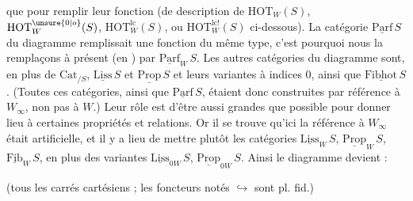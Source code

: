que  pour remplir leur fonction (de description de $\mathrm{HOT}_W(S)$, $\mathrm{HOT}_W^{\unsure{0|o}}(S)$, $\mathrm{HOT}_W^{\mathrm{lc}}(S)$, ou $\mathrm{HOT}_W^{\mathrm{lc}!}(S)$
ci-dessous). La catégorie $\underline{\mathrm{Parf}}\,S$ du diagramme
remplissait une fonction du même type, c'est
pourquoi nous la remplaçons à présent (en ) par $\underline{\mathrm{Parf}}_W\,S$. Les autres catégories du
diagramme sont, en plus de $\mathrm{Cat}_{/S}$, $\underline{\mathrm{Liss}}\,S$ et
$\underline{\mathrm{Prop}}\,S$ et leurs variantes à indices $0$, ainsi que
$\underline{\mathrm{Fibhot}}\,S$. (Toutes ces catégories, ainsi que $\underline{\mathrm{Parf}}\,S$, étaient
donc construites par référence à $W_\infty$, non pas
à $W$.) Leur rôle  est d'être aussi grandes
que possible pour donner lieu à certaines
propriétés et relations. Or il se trouve qu'ici la
référence à $W_\infty$ était artificielle, et il y a
lieu de mettre plutôt les catégories
$\underline{\mathrm{Liss}}_W\,S$, $\underline{\mathrm{Prop}}_W\,S$, $\underline{\mathrm{Fib}}_W\,S$,  en plus des variantes
$\underline{\mathrm{Liss}}_{0W}\,S$, $\underline{\mathrm{Prop}}_{0W}\,S$. Ainsi le diagramme devient :

(tous les carrés cartésiens ; les foncteurs notés $\hookrightarrow$ sont pl. fid.)
